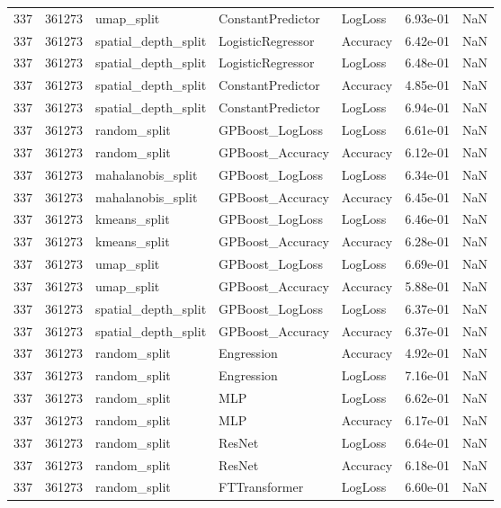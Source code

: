 \begin{tabular}{rrlllrr}
337 & 361273 & umap\_split & ConstantPredictor & LogLoss & 6.93e-01 & NaN \\
337 & 361273 & spatial\_depth\_split & LogisticRegressor & Accuracy & 6.42e-01 & NaN \\
337 & 361273 & spatial\_depth\_split & LogisticRegressor & LogLoss & 6.48e-01 & NaN \\
337 & 361273 & spatial\_depth\_split & ConstantPredictor & Accuracy & 4.85e-01 & NaN \\
337 & 361273 & spatial\_depth\_split & ConstantPredictor & LogLoss & 6.94e-01 & NaN \\
337 & 361273 & random\_split & GPBoost\_LogLoss & LogLoss & 6.61e-01 & NaN \\
337 & 361273 & random\_split & GPBoost\_Accuracy & Accuracy & 6.12e-01 & NaN \\
337 & 361273 & mahalanobis\_split & GPBoost\_LogLoss & LogLoss & 6.34e-01 & NaN \\
337 & 361273 & mahalanobis\_split & GPBoost\_Accuracy & Accuracy & 6.45e-01 & NaN \\
337 & 361273 & kmeans\_split & GPBoost\_LogLoss & LogLoss & 6.46e-01 & NaN \\
337 & 361273 & kmeans\_split & GPBoost\_Accuracy & Accuracy & 6.28e-01 & NaN \\
337 & 361273 & umap\_split & GPBoost\_LogLoss & LogLoss & 6.69e-01 & NaN \\
337 & 361273 & umap\_split & GPBoost\_Accuracy & Accuracy & 5.88e-01 & NaN \\
337 & 361273 & spatial\_depth\_split & GPBoost\_LogLoss & LogLoss & 6.37e-01 & NaN \\
337 & 361273 & spatial\_depth\_split & GPBoost\_Accuracy & Accuracy & 6.37e-01 & NaN \\
337 & 361273 & random\_split & Engression & Accuracy & 4.92e-01 & NaN \\
337 & 361273 & random\_split & Engression & LogLoss & 7.16e-01 & NaN \\
337 & 361273 & random\_split & MLP & LogLoss & 6.62e-01 & NaN \\
337 & 361273 & random\_split & MLP & Accuracy & 6.17e-01 & NaN \\
337 & 361273 & random\_split & ResNet & LogLoss & 6.64e-01 & NaN \\
337 & 361273 & random\_split & ResNet & Accuracy & 6.18e-01 & NaN \\
337 & 361273 & random\_split & FTTransformer & LogLoss & 6.60e-01 & NaN \\

\end{tabular}
